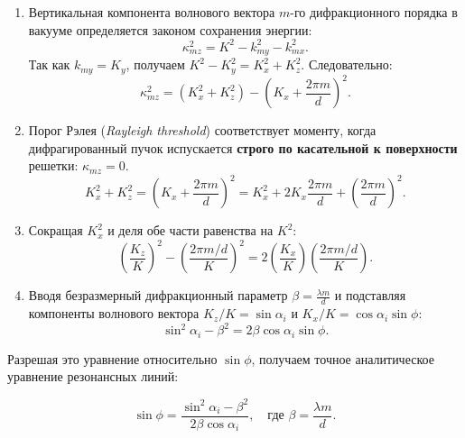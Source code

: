 \documentclass[a4paper,11pt]{article}
\begin{document}
\begin{enumerate}
    \item Вертикальная компонента волнового вектора $m$-го дифракционного порядка в вакууме определяется законом сохранения энергии:
    \begin{equation}
        \kappa_{mz}^2 = K^2 - k_{my}^2 - k_{mx}^2.
    \end{equation}
    Так как $k_{my} = K_y$, получаем $K^2 - K_y^2 = K_x^2 + K_z^2$. Следовательно:
    \begin{equation}
        \kappa_{mz}^2 = (K_x^2 + K_z^2) - \left( K_x + \frac{2\pi m}{d} \right)^2.
    \end{equation}
    \item Порог Рэлея (\textit{Rayleigh threshold}) соответствует моменту, когда дифрагированный пучок испускается \textbf{строго по касательной к поверхности} решетки: $\kappa_{mz} = 0$.
    \begin{equation}
        K_x^2 + K_z^2 = \left( K_x + \frac{2\pi m}{d} \right)^2 = K_x^2 + 2 K_x \frac{2\pi m}{d} + \left(\frac{2\pi m}{d}\right)^2.
    \end{equation}
    \item Сокращая $K_x^2$ и деля обе части равенства на $K^2$:
    \begin{equation}
        \left(\frac{K_z}{K}\right)^2 - \left(\frac{2\pi m / d}{K}\right)^2 = 2 \left(\frac{K_x}{K}\right) \left(\frac{2\pi m / d}{K}\right).
    \end{equation}
    \item Вводя безразмерный дифракционный параметр $\beta = \frac{\lambda m}{d}$ и подставляя компоненты волнового вектора $K_z / K = \sin\alpha_i$ и $K_x / K = \cos\alpha_i \sin\phi$:
    \begin{equation}
        \sin^2\alpha_i - \beta^2 = 2 \beta \cos\alpha_i \sin\phi.
    \end{equation}
\end{enumerate}

Разрешая это уравнение относительно $\sin\phi$, получаем точное аналитическое уравнение резонансных линий:

\begin{mathbox}
\begin{equation}
    \sin\phi = \frac{\sin^2\alpha_i - \beta^2}{2\beta \cos\alpha_i}, \quad \text{где } \beta = \frac{\lambda m}{d}.
    \label{eq:rayleigh_lines_p}
\end{equation}
\end{mathbox}
\end{document}
